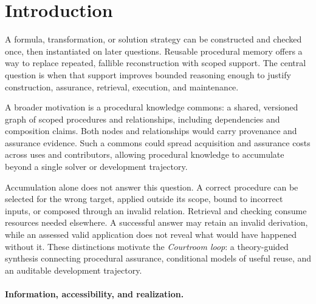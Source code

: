 \documentclass[10pt]{article} %
\providecommand{\1}{\mathbf{1}}  %
\theoremstyle{remark}
\theoremstyle{definition}
\begin{document}
\section{Introduction}
\label{sec:introduction}

A formula, transformation, or solution strategy can be constructed and
checked once, then instantiated on later questions. Reusable procedural
memory offers a way to replace repeated, fallible reconstruction with
scoped support. The central question is when that support improves
bounded reasoning enough to justify construction, assurance, retrieval,
execution, and maintenance.

A broader motivation is a procedural knowledge commons: a shared,
versioned graph of scoped procedures and relationships, including
dependencies and composition claims. Both nodes and relationships would
carry provenance and assurance evidence. Such a commons could spread
acquisition and assurance costs across uses and contributors, allowing
procedural knowledge to accumulate beyond a single solver or development
trajectory.

Accumulation alone does not answer this question. A correct procedure can
be selected for the wrong target, applied outside its scope, bound to
incorrect inputs, or composed through an invalid relation. Retrieval and
checking consume resources needed elsewhere. A successful answer may
retain an invalid derivation, while an assessed valid application does
not reveal what would have happened without it. These distinctions
motivate the \emph{Courtroom loop}: a theory-guided synthesis connecting
procedural assurance, conditional models of useful reuse, and an
auditable development trajectory.

\paragraph{Information, accessibility, and realization.}
\end{document}
